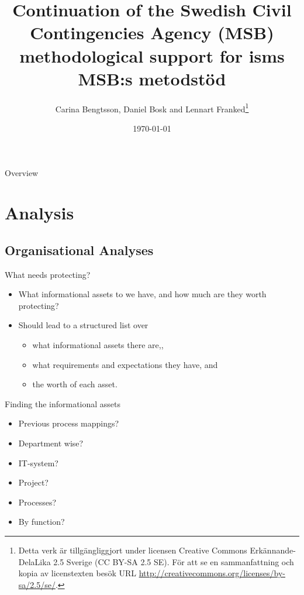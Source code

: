 \documentclass{beamer}
\title[Introduction Information Security]{%
  Continuation of the Swedish Civil Contingencies Agency (MSB) 
  methodological support for \ac{isms}\\
  MSB:s metodstöd
}
\author{Carina Bengtsson, Daniel Bosk and Lennart Franked\footnote{%
  Detta verk är tillgängliggjort under licensen Creative Commons 
  Erkännande-DelaLika 2.5 Sverige (CC BY-SA 2.5 SE).
	För att se en sammanfattning och kopia av licenstexten besök URL 
	\url{http://creativecommons.org/licenses/by-sa/2.5/se/}.
}}
\institute[MIUN ITM]{%
  Department of Informationsystems and Technologies\\
  Mid Sweden University,
  Sundsvall.
}
\date{\today}
\begin{document}
\begin{frame}
  \titlepage{}
\end{frame}

\begin{frame}{Overview}
  \begin{multicols}{2}
    \tableofcontents
  \end{multicols}
\end{frame}




\section{Analysis}

\subsection{Organisational Analyses}

\begin{frame}{What needs protecting?}
  \begin{itemize}
    \item What informational assets to we have, and how much are they worth
      protecting?
    \item Should lead to a structured list over
      \begin{itemize}
        \item what informational assets there are,,
        \item what requirements and expectations they have, and
        \item the worth of each asset.
      \end{itemize}
  \end{itemize}
\end{frame}

\begin{frame}{Finding the informational assets}
  \begin{itemize}
    \item Previous process mappings?
    \item Department wise?
    \item IT-system?
    \item Project?
    \item Processes?
    \item By function?
  \end{itemize}
\end{frame}
\end{document}
